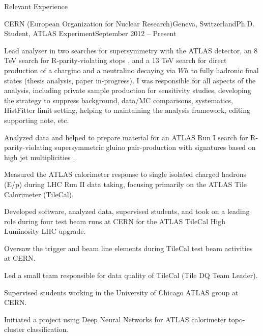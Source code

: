 \documentclass{resume}
\begin{document}

\begin{rsection}{Relevant Experience}

  \begin{rsubsection}{CERN (European Organization for Nuclear Research)}{Geneva, Switzerland}{Ph.D. Student, ATLAS Experiment}{September 2012 -- Present}
  \item Lead analyser in two searches for supersymmetry with the ATLAS detector, an 8 TeV search for R-parity-violating stops \cite{RPVstop2016}, and a 13 TeV search for direct production of a chargino and a neutralino decaying via $Wh$ to fully hadronic final states (thesis analysis, paper in-progress). I was responsible for all aspects of the analysis, including private sample production for sensitivity studies, developing the strategy to suppress background, data/MC comparisons, systematics, HistFitter limit setting, helping to maintaining the analysis framework, editing supporting note, etc.
  \item Analyzed data and helped to prepare material for an ATLAS Run I search for R-parity-violating supersymmetric gluino pair-production with signatures based on high jet multiplicities \cite{Multijet2015}. 
  \item Measured the ATLAS calorimeter response to single isolated charged hadrons (E/p) during LHC Run II data taking, focusing primarily on the ATLAS Tile Calorimeter (TileCal).
  \item Developed software, analyzed data, supervised students, and took on a leading role during four test beam runs at CERN for the ATLAS TileCal High Luminosity LHC upgrade.
  \item Oversaw the trigger and beam line elements during TileCal test beam activities at CERN. 
  \item Led a small team responsible for data quality of TileCal (Tile DQ Team Leader).
  \item Supervised students working in the University of Chicago ATLAS group at CERN.
  \item Initiated a project using Deep Neural Networks for ATLAS calorimeter topo-cluster classification.
  \end{rsubsection}



\end{rsection}
\end{document}
